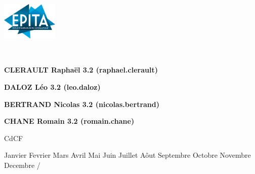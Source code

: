 
\begin{center}
\includegraphics[width=0.2\textwidth]{figuras/Epita.png}

\\

\vspace{6cm}

\vspace{6cm}



\textbf{CLERAULT Raphaël 3.2 (raphael.clerault)}

\textbf{DALOZ Léo 3.2 (leo.daloz)}

\textbf{BERTRAND Nicolas 3.2 (nicolas.bertrand)}

\textbf{CHANE Romain 3.2 (romain.chane)}

\end{center}

\vspace{0.2cm}
\hfill
\begin{minipage}{9cm}


\end{minipage}

\begin{center}
\vfill
\vspace{1cm}

CdCF \\

\newcommand{\mes}{\ifcase\month\or 
    Janvier \or Fevrier \or Mars \or Avril \or Mai \or Juin \or 
    Juillet \or Aôut \or Septembre \or Octobre \or Novembre \or 
    Decembre \fi} 
    
\def\ano{\expandafter\YEAR\the\year}
\def\YEAR#1#2#3#4{#1#2#3#4}
    
{ \mes / \ano}


\end{center}